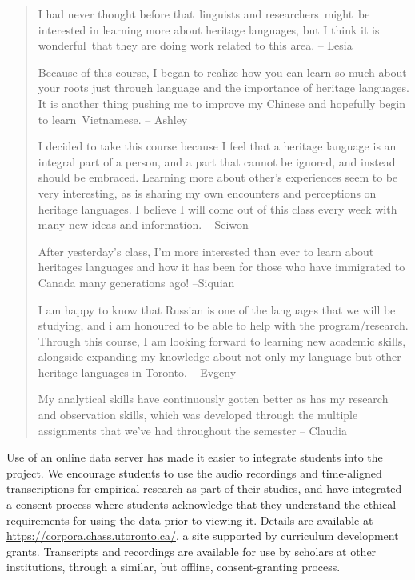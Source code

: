 \documentclass[output=paper]{LSP/langsci}
\begin{document}
\begin{quote}
I had never thought before that~linguists and researchers~might~be interested in learning more about heritage languages, but I think it is wonderful~that they are doing work related to this area. – Lesia

Because of this course, I began to realize how you can learn so much about your roots just through language and the importance of heritage languages. It is another thing pushing me to improve my Chinese and hopefully begin to learn~Vietnamese. – Ashley

 I decided to take this course because I feel that a heritage language is an integral part of a person, and a part that cannot be ignored, and instead should be embraced. Learning more about other’s experiences seem to be very interesting, as is sharing my own encounters and perceptions on heritage languages. I believe I will come out of this class every week with many new ideas and information. – Seiwon

After yesterday's class, I'm more interested than ever to learn about heritages languages and how it has been for those who have immigrated to Canada many generations ago! –Siquian

I am happy to know that Russian is one of the languages that we will be studying, and i am honoured to be able to help with the program/research. Through this course, I am looking forward to learning new academic skills, alongside expanding my knowledge about not only my language but other heritage languages in Toronto. – Evgeny

My analytical skills have continuously gotten better as has my research and observation skills, which was developed through the multiple assignments that we've had throughout the semester – Claudia
\end{quote}

Use of an online data server has made it easier to integrate students into the project. We encourage students to use the audio recordings and time-aligned transcriptions for empirical research as part of their studies, and have integrated a consent process where students acknowledge that they understand the ethical requirements for using the data prior to viewing it. Details are available at \url{https://corpora.chass.utoronto.ca/}, a site supported by curriculum development grants. Transcripts and recordings are available for use by scholars at other institutions, through a similar, but offline, consent-granting process.
\end{document}
